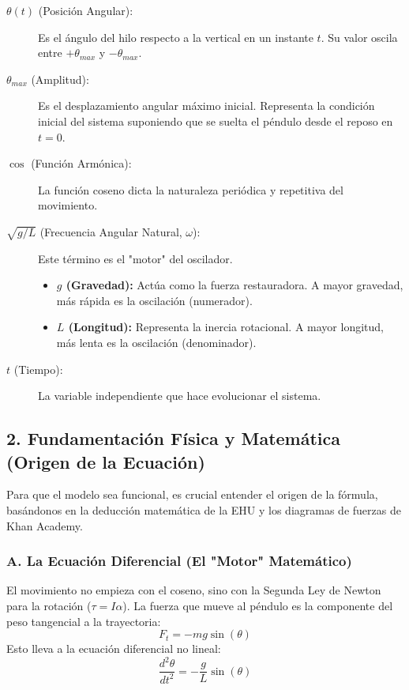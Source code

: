 \documentclass[12pt, a4paper]{article}
\begin{document}
	\begin{description}
		\item[$\theta(t)$ (Posición Angular):] Es el ángulo del hilo respecto a la vertical en un instante $t$. Su valor oscila entre $+\theta_{max}$ y $-\theta_{max}$.
		
		\item[$\theta_{max}$ (Amplitud):] Es el desplazamiento angular máximo inicial. Representa la condición inicial del sistema suponiendo que se suelta el péndulo desde el reposo en $t=0$.
		
		\item[$\cos$ (Función Armónica):] La función coseno dicta la naturaleza periódica y repetitiva del movimiento.
		
		\item[$\sqrt{g/L}$ (Frecuencia Angular Natural, $\omega$):] Este término es el "motor" del oscilador.
		\begin{itemize}
			\item \textbf{$g$ (Gravedad):} Actúa como la fuerza restauradora. A mayor gravedad, más rápida es la oscilación (numerador).
			\item \textbf{$L$ (Longitud):} Representa la inercia rotacional. A mayor longitud, más lenta es la oscilación (denominador).
		\end{itemize}
		
		\item[$t$ (Tiempo):] La variable independiente que hace evolucionar el sistema.
	\end{description}
	
	\subsection{2. Fundamentación Física y Matemática (Origen de la Ecuación)}
	Para que el modelo sea funcional, es crucial entender el origen de la fórmula, basándonos en la deducción matemática de la EHU y los diagramas de fuerzas de Khan Academy.
	
	
	
	\subsubsection*{A. La Ecuación Diferencial (El "Motor" Matemático)}
	El movimiento no empieza con el coseno, sino con la Segunda Ley de Newton para la rotación ($\tau = I \alpha$). La fuerza que mueve al péndulo es la componente del peso tangencial a la trayectoria:
	\begin{equation}
		F_t = -mg \sin(\theta)
	\end{equation}
	Esto lleva a la ecuación diferencial no lineal:
	\begin{equation}
		\frac{d^2\theta}{dt^2} = -\frac{g}{L} \sin(\theta)
	\end{equation}
	
\end{document}
